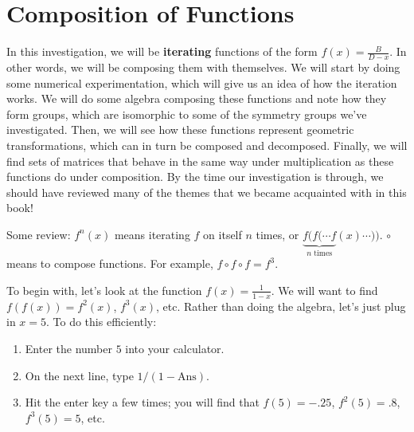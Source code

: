 \documentclass[../textbook.tex]{subfiles}
\begin{document}
\section{Composition of Functions}

In this investigation, we will be \textbf{iterating} functions of the form $f(x)=\frac{B}{D-x}$. In other words, we will be composing them with themselves. We will start by doing some numerical experimentation, which will give us an idea of how the iteration works. We will do some algebra composing these functions and note how they form groups, which are isomorphic to some of the symmetry groups we've investigated. Then, we will see how these functions represent geometric transformations, which can in turn be composed and decomposed. Finally, we will find sets of matrices that behave in the same way under multiplication as these functions do under composition. By the time our investigation is through, we should have reviewed many of the themes that we became acquainted with in this book!

Some review: $f^n(x)$ means iterating $f$ on itself $n$ times, or $\underbrace{f(f(\cdots f}_{n\text{ times}}(x)\cdots ))$. $\circ$ means to compose functions. For example, $f\circ f\circ f = f^3$.

To begin with, let's look at the function $f(x)=\frac{1}{1-x}$. We will want to find $f(f(x))=f^2(x)$, $f^3(x)$, etc. Rather than doing the algebra, let's just plug in $x=5$. To do this efficiently:

\begin{enumerate}
\item Enter the number $5$ into your calculator.
\item On the next line, type $1/(1-\text{Ans}).$
\item Hit the enter key a few times; you will find that $f(5)=-.25$, $f^2(5)=.8$, $f^3(5)=5$, etc.
\end{enumerate}
\end{document}
